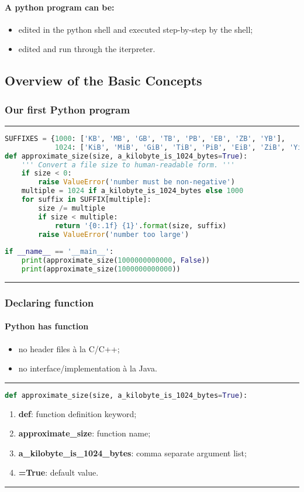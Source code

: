 \paragraph{A python program can be:}
\begin{itemize}
	\item edited in the python shell and executed step-by-step by the shell;
	\item edited and run through the iterpreter.
\end{itemize}
\subsection{Overview of the Basic Concepts}	
\subsubsection{Our first Python program}
\hrule
\begin{lstlisting}[language=Python, caption=humanize.py]
SUFFIXES = {1000: ['KB', 'MB', 'GB', 'TB', 'PB', 'EB', 'ZB', 'YB'], 
            1024: ['KiB', 'MiB', 'GiB', 'TiB', 'PiB', 'EiB', 'ZiB', 'YiB']}
def approximate_size(size, a_kilobyte_is_1024_bytes=True):
	''' Convert a file size to human-readable form. '''
	if size < 0:
		raise ValueError('number must be non-negative')
	multiple = 1024 if a_kilobyte_is_1024_bytes else 1000
	for suffix in SUFFIX[multiple]:
		size /= multiple
		if size < multiple:
			return '{0:.1f} {1}'.format(size, suffix)
		raise ValueError('number too large')
				
if __name__ == '__main__':
	print(approximate_size(1000000000000, False))
	print(approximate_size(1000000000000))
\end{lstlisting}
\hrule	
\subsubsection{Declaring function}	
\paragraph{Python has function}
\begin{itemize}
	\item no header files à la C/C++;
	\item no interface/implementation à la Java.
\end{itemize}			
\hrule
\begin{lstlisting}[language=Python]
def approximate_size(size, a_kilobyte_is_1024_bytes=True):
\end{lstlisting}	
\begin{enumerate}
	\item \textbf{def}: function definition keyword;
	\item \textbf{approximate\_size}: function name;
	\item \textbf{a\_kilobyte\_is\_1024\_bytes}: comma separate argument list;
	\item \textbf{=True}: default value.
\end{enumerate}
\hrule		
